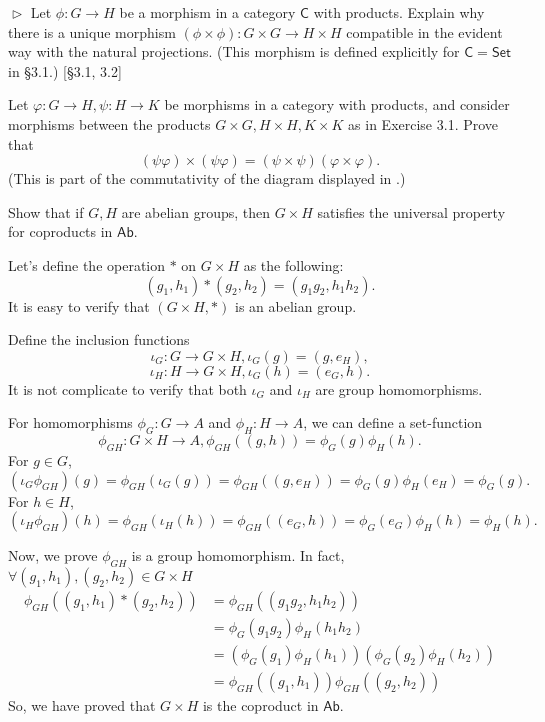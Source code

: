 \begin{problem}[3.1]
$\vartriangleright$ Let $\phi: G \to H$ be a morphism in a category $\mathsf{C}$ with products. Explain why
there is a unique morphism $(\phi \times \phi): G \times G \to H \times H$ compatible in the evident
way with the natural projections.
(This morphism is defined explicitly for $\mathsf{C} = \mathsf{Set}$ in \S 3.1.) [\S 3.1, 3.2]
\end{problem}
\begin{solution}
\end{solution}

\begin{problem}[3.2]
  Let $\varphi : G\rightarrow H, \psi : H \rightarrow K$ be morphisms in a category with products, and
  consider morphisms between the products $G\times G, H\times H, K\times K$ as in Exercise 3.1.
  Prove that
  \[
  (\psi\varphi) \times(\psi\varphi)=(\psi \times \psi)(\varphi\times \varphi) .
  \]
  (This is part of the commutativity of the diagram displayed in .)
\end{problem}
\begin{solution}
\end{solution}

\hypertarget{Exercise II.3.3}{}
\begin{problem}[3.3]
  Show that if $G, H$ are abelian groups, then $G \times H$ satisfies the universal property for coproducts in $\mathsf{Ab}$.
\end{problem}
\begin{solution}
Let's define the operation $\ast$ on $G\times H$ as the following:
$$(g_1,h_1)\ast(g_2,h_2) = (g_1g_2, h_1h_2).$$ It is easy to verify that $(G\times H, \ast)$ is an abelian group.

\noindent Define the inclusion functions
$$\iota_G: G \to G\times H, \iota_G(g)=(g, e_H),$$
$$\iota_H: H \to G\times H, \iota_G(h)=(e_G, h).$$
It is not complicate to verify that both $\iota_G$ and $\iota_H$ are group homomorphisms.

\noindent For homomorphisms $\phi_G: G\to A$ and $\phi_H: H\to A$, we can define a set-function 
$$\phi_{GH}: G\times H \to A, \phi_{GH}((g,h))=\phi_G(g)\phi_H(h).$$
For $g\in G$, $$(\iota_G\phi_{GH})(g) = \phi_{GH}(\iota_G(g)) = \phi_{GH}((g, e_H))=\phi_G(g)\phi_H(e_H)=\phi_G(g).$$
For $h\in H$, $$(\iota_H\phi_{GH})(h) = \phi_{GH}(\iota_H(h)) = \phi_{GH}((e_G, h))=\phi_G(e_G)\phi_H(h)=\phi_H(h).$$

\noindent Now, we prove $\phi_{GH}$ is a group homomorphism. In fact, $\forall (g_1,h_1), (g_2,h_2)\in G\times H$
\begin{equation*}\begin{split}
\phi_{GH}((g_1, h_1)\ast(g_2,h_2)) &= \phi_{GH}((g_1g_2,h_1h_2))\\&=\phi_G(g_1g_2)\phi_H(h_1h_2) \\&= (\phi_G(g_1)\phi_H(h_1))(\phi_G(g_2)\phi_H(h_2)) \\&=\phi_{GH}((g_1,h_1))\phi_{GH}((g_2,h_2))
\end{split}
\end{equation*}
So, we have proved that $G\times H$ is the coproduct in $\mathsf{Ab}$. 
\end{solution}


